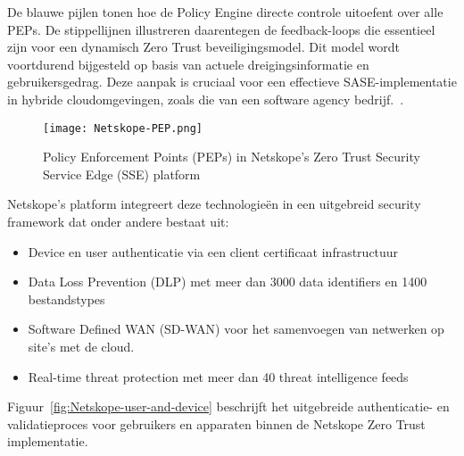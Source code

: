 De blauwe pijlen tonen hoe de Policy Engine directe controle uitoefent over alle PEPs. De stippellijnen illustreren daarentegen de feedback-loops die essentieel zijn voor een dynamisch Zero Trust beveiligingsmodel. Dit model wordt voortdurend bijgesteld op basis van actuele dreigingsinformatie en gebruikersgedrag. Deze aanpak is cruciaal voor een effectieve SASE-implementatie in hybride cloudomgevingen, zoals die van een software agency bedrijf.~\autocite{Netskope2024}.
\begin{figure}[h!]
  \centering
  \texttt{[image: Netskope-PEP.png]}
  \caption[Netskope Policy Enforcement Points (PEPs)]{Policy Enforcement Points (PEPs) in Netskope's Zero Trust Security Service Edge (SSE) platform~\autocite{Netskope2024}}
  \label{fig:Netskope-PEP}
\end{figure}


Netskope's platform integreert deze technologieën in een uitgebreid security framework dat onder andere bestaat uit:

\begin{itemize}
  \item Device en user authenticatie via een client certificaat infrastructuur
  \item Data Loss Prevention (DLP) met meer dan 3000 data identifiers en 1400 bestandstypes
  \item Software Defined WAN (SD-WAN) voor het samenvoegen van netwerken op site's met de cloud.
  \item Real-time threat protection met meer dan 40 threat intelligence feeds
\end{itemize}

Figuur~\ref{fig:Netskope-user-and-device} beschrijft het uitgebreide authenticatie- en validatieproces voor gebruikers en apparaten binnen de Netskope Zero Trust implementatie. 

\vspace{2ex}

